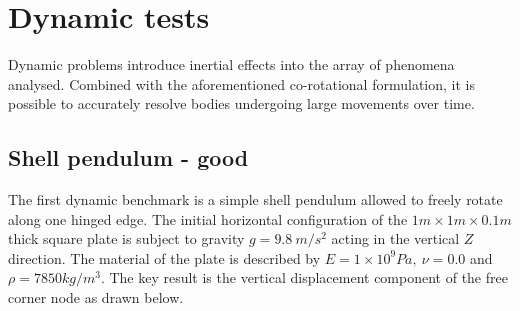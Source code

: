 \section{Dynamic tests}

Dynamic problems introduce inertial effects into the array of phenomena analysed. Combined with the aforementioned co-rotational formulation, it is possible to accurately resolve bodies undergoing large movements over time.

\subsection{Shell pendulum - good}
\label{validation:shell pendulum}
The first dynamic benchmark is a simple shell pendulum allowed to freely rotate along one hinged edge. The initial horizontal configuration of the $1m\times1m\times0.1m$ thick square plate is subject to gravity $g = 9.8\ m/s^2$ acting in the vertical $Z$ direction. The material of the plate is described by $E = 1\times 10^9 Pa,\ \nu = 0.0$ and $\rho = 7850 kg/m^3$. The key result is the vertical displacement component of the free corner node as drawn below.


